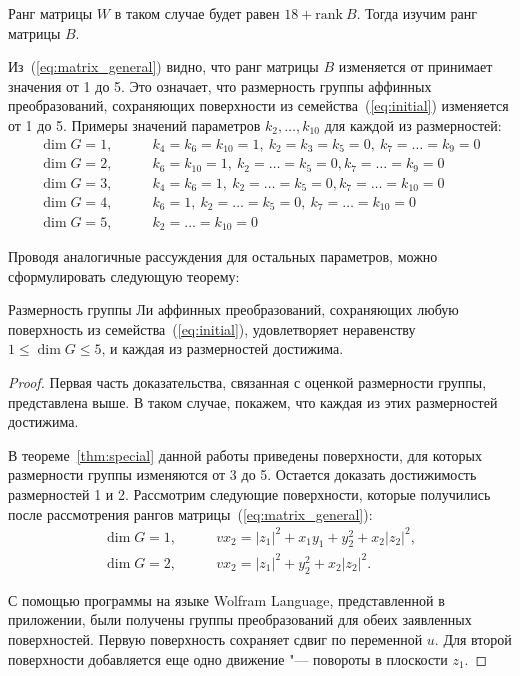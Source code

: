 \documentclass[../main.tex]{subfiles}
\begin{document}
Ранг матрицы $W$ в таком случае будет равен $18 + \mathrm{rank}~B$. Тогда изучим ранг матрицы $B$. 

Из~(\ref{eq:matrix_general}) видно, что ранг матрицы $B$ изменяется от принимает значения от 1 до 5. Это означает, что размерность группы аффинных преобразований, сохраняющих поверхности из семейства~(\ref{eq:initial}) изменяется от 1 до 5. Примеры значений параметров $k_2,\hdots,k_{10}$ для каждой из размерностей:
\begin{align*}
\dim G = 1,&\qquad k_4 = k_6 = k_{10} = 1,~k_2 = k_3 = k_5 = 0,~k_7 = \hdots = k_9 = 0 \\
\dim G = 2,&\qquad k_6 = k_{10} = 1,~k_2 = \hdots = k_5 = 0, k_7 = \hdots = k_9 = 0 \\
\dim G = 3,&\qquad k_4 = k_6 = 1,~k_2 = \hdots = k_5 = 0, k_7 = \hdots = k_{10} = 0 \\
\dim G = 4,&\qquad k_6 = 1,~k_2 = \hdots = k_5 = 0,~k_7 = \hdots = k_{10} = 0 \\
\dim G = 5,&\qquad k_2 = \hdots = k_{10} = 0 
\end{align*}

Проводя аналогичные рассуждения для остальных параметров, можно сформулировать следующую теорему:

\begin{theorem} Размерность группы Ли аффинных преобразований, сохраняющих любую поверхность из семейства~(\ref{eq:initial}), удовлетворяет неравенству $1 \le \dim G \le 5$, и каждая из размерностей достижима.
\end{theorem}
\begin{proof}
Первая часть доказательства, связанная с оценкой размерности группы, представлена выше. В таком случае, покажем, что каждая из этих размерностей достижима. 

В теореме~\ref{thm:special} данной работы приведены поверхности, для которых размерности группы изменяются от 3 до 5. Остается доказать достижимость размерностей 1 и 2. Рассмотрим следующие поверхности, которые получились после рассмотрения рангов матрицы~(\ref{eq:matrix_general}):
\begin{align}
\dim G = 1, &\qquad v x_2 = {|z_1|}^2 + x_1 y_1 + y_2 ^2 + x_2 {|z_2|}^2, \label{eq:general_1}\\
\dim G = 2, &\qquad v x_2 = {|z_1|}^2 + y_2^2 + x_2 {|z_2|}^2.\label{eq:general_2}
\end{align}

С помощью программы на языке {\ttfamily Wolfram Language}, представленной в приложении, были получены группы преобразований для обеих заявленных поверхностей. Первую поверхность сохраняет сдвиг по переменной $u$. Для второй поверхности добавляется еще одно движение "--- повороты в плоскости $z_1$. 
\end{proof}
\end{document}
